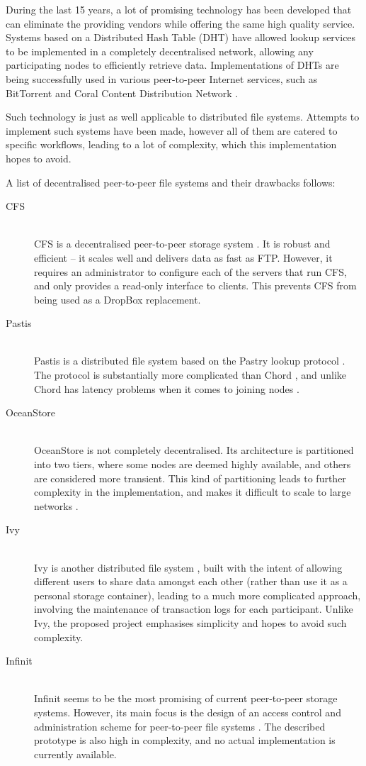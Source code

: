 \documentclass[8pt,a4paper]{article}
\begin{document}
During the last 15 years, a lot of promising technology has been developed that can eliminate the providing vendors while offering the same high quality service. 
Systems based on a Distributed Hash Table (DHT) have allowed lookup services to be implemented in a completely decentralised network, allowing any participating nodes to efficiently retrieve data. Implementations of DHTs are being successfully used in various peer-to-peer Internet services, such as BitTorrent and Coral Content Distribution Network \cite{coral}.

Such technology is just as well applicable to distributed file systems. Attempts to implement such systems have been made, however all of them are catered to specific workflows, leading to a lot of complexity, which this implementation hopes to avoid.

A list of decentralised peer-to-peer file systems and their drawbacks follows:

\begin{description}
  \item[CFS] \hfill \\ 
  CFS is a decentralised peer-to-peer storage system \cite{cfs}. It is robust and efficient -- it scales well and delivers data as fast as FTP. However, it requires an administrator to configure each of the servers that run CFS, and only provides a read-only interface to clients. This prevents CFS from being used as a DropBox replacement. 
  \item[Pastis] \hfill \\
  Pastis is a distributed file system based on the Pastry lookup protocol \cite{pastis}. The protocol is substantially more complicated than Chord \cite{chord}, and unlike Chord has latency problems when it comes to joining nodes \cite{chordalt}.
  \item[OceanStore] \hfill \\
  OceanStore \cite{oceanstore} is not completely decentralised. Its architecture is partitioned into two tiers, where some nodes are deemed highly available, and others are considered more transient. This kind of partitioning leads to further complexity in the implementation, and makes it difficult to scale to large networks \cite{towards}.
  \item[Ivy] \hfill \\
  Ivy is another distributed file system \cite{ivy}, built with the intent of allowing different users to share data amongst each other (rather than use it as a personal storage container), leading to a much more complicated approach, involving the maintenance of transaction logs for each participant. Unlike Ivy, the proposed project emphasises simplicity and hopes to avoid such complexity.
  \item[Infinit] \hfill \\ 
  Infinit seems to be the most promising of current peer-to-peer storage systems. However, its main focus is the design of an access control and administration scheme for peer-to-peer file systems \cite{towards}. The described prototype is also high in complexity, and no actual implementation is currently available.
\end{description}
\end{document}

